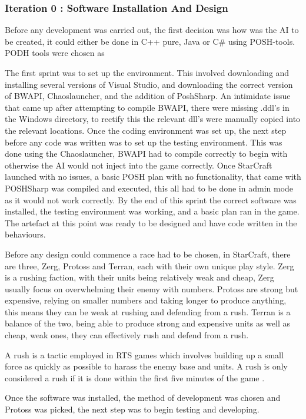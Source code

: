\documentclass[journal]{IEEEtran}
\begin{document}
\subsubsection{Iteration 0 : Software Installation And Design}
Before any development was carried out, the first decision was how was the AI to be created, it could either be done in C++ pure, Java or C\# using POSH-tools. PODH tools were chosen as
 
The first sprint was to set up the environment. This involved downloading and installing several versions of Visual Studio, and downloading the correct version of BWAPI, Chaoslauncher, and the addition of PoshSharp. An intimidate issue that came up after attempting to compile BWAPI, there were missing .ddl's in the Windows directory, to rectify this the relevant dll's were manually copied into the relevant locations. Once the coding environment was set up, the next step before any code was written was to set up the testing environment. This was done using the Chaoslauncher, BWAPI had to compile correctly to begin with otherwise the AI would not inject into the game correctly. Once StarCraft launched with no issues, a basic POSH plan with no functionality, that came with POSHSharp was compiled and executed, this all had to be done in admin mode as it would not work correctly. By the end of this sprint the correct software was installed, the testing environment was working, and a basic plan ran in the game. The artefact at this point was ready to be designed and have code written in the behaviours.

Before any design could commence a race had to be chosen, in StarCraft, there are three, Zerg, Protoss and Terran, each with their own unique play style. Zerg is a rushing faction, with their units being relatively weak and cheap, Zerg usually focus on overwhelming their enemy with numbers. Protoss are strong but expensive, relying on smaller numbers and taking longer to produce anything, this means they can be weak at rushing and defending from a rush. Terran is a balance of the two, being able to produce strong and expensive units as well as cheap, weak ones, they can effectively rush and defend from a rush.

A rush is a tactic employed in RTS games which involves building up a small force as quickly as possible to harass the enemy base and units. A rush is only considered a rush if it is done within the first five minutes of the game \cite{Liqui}.

Once the software was installed, the method of development was chosen and Protoss was picked, the next step was to begin testing and developing. 
\newline
\end{document}
